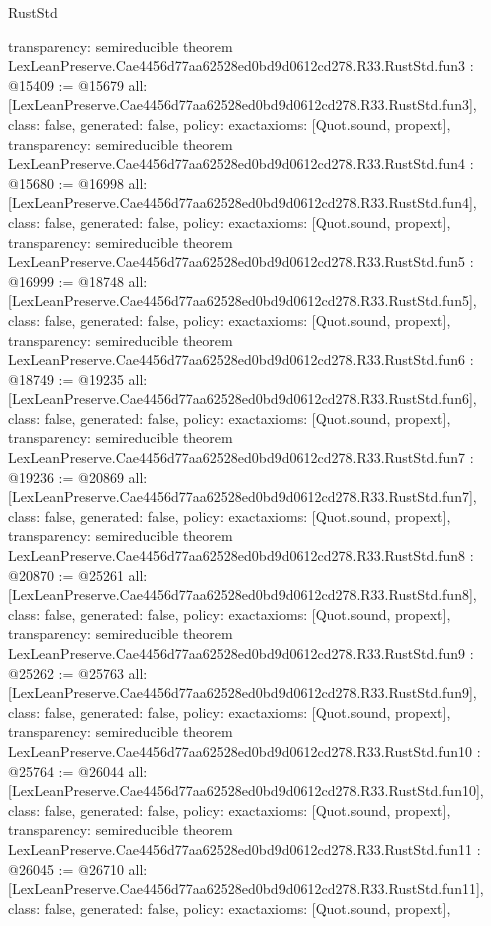 \begin{lexlean}{RustStd}
\begin{coremodule}
{  transparency: semireducible
}
theorem LexLeanPreserve.Cae4456d77aa62528ed0bd9d0612cd278.R33.RustStd.fun3 : @15409 := @15679 {
  all: [LexLeanPreserve.Cae4456d77aa62528ed0bd9d0612cd278.R33.RustStd.fun3],
  class: false,
  generated: false,
  policy: exact{axioms: [Quot.sound, propext]},
  transparency: semireducible
}
theorem LexLeanPreserve.Cae4456d77aa62528ed0bd9d0612cd278.R33.RustStd.fun4 : @15680 := @16998 {
  all: [LexLeanPreserve.Cae4456d77aa62528ed0bd9d0612cd278.R33.RustStd.fun4],
  class: false,
  generated: false,
  policy: exact{axioms: [Quot.sound, propext]},
  transparency: semireducible
}
theorem LexLeanPreserve.Cae4456d77aa62528ed0bd9d0612cd278.R33.RustStd.fun5 : @16999 := @18748 {
  all: [LexLeanPreserve.Cae4456d77aa62528ed0bd9d0612cd278.R33.RustStd.fun5],
  class: false,
  generated: false,
  policy: exact{axioms: [Quot.sound, propext]},
  transparency: semireducible
}
theorem LexLeanPreserve.Cae4456d77aa62528ed0bd9d0612cd278.R33.RustStd.fun6 : @18749 := @19235 {
  all: [LexLeanPreserve.Cae4456d77aa62528ed0bd9d0612cd278.R33.RustStd.fun6],
  class: false,
  generated: false,
  policy: exact{axioms: [Quot.sound, propext]},
  transparency: semireducible
}
theorem LexLeanPreserve.Cae4456d77aa62528ed0bd9d0612cd278.R33.RustStd.fun7 : @19236 := @20869 {
  all: [LexLeanPreserve.Cae4456d77aa62528ed0bd9d0612cd278.R33.RustStd.fun7],
  class: false,
  generated: false,
  policy: exact{axioms: [Quot.sound, propext]},
  transparency: semireducible
}
theorem LexLeanPreserve.Cae4456d77aa62528ed0bd9d0612cd278.R33.RustStd.fun8 : @20870 := @25261 {
  all: [LexLeanPreserve.Cae4456d77aa62528ed0bd9d0612cd278.R33.RustStd.fun8],
  class: false,
  generated: false,
  policy: exact{axioms: [Quot.sound, propext]},
  transparency: semireducible
}
theorem LexLeanPreserve.Cae4456d77aa62528ed0bd9d0612cd278.R33.RustStd.fun9 : @25262 := @25763 {
  all: [LexLeanPreserve.Cae4456d77aa62528ed0bd9d0612cd278.R33.RustStd.fun9],
  class: false,
  generated: false,
  policy: exact{axioms: [Quot.sound, propext]},
  transparency: semireducible
}
theorem LexLeanPreserve.Cae4456d77aa62528ed0bd9d0612cd278.R33.RustStd.fun10 : @25764 := @26044 {
  all: [LexLeanPreserve.Cae4456d77aa62528ed0bd9d0612cd278.R33.RustStd.fun10],
  class: false,
  generated: false,
  policy: exact{axioms: [Quot.sound, propext]},
  transparency: semireducible
}
theorem LexLeanPreserve.Cae4456d77aa62528ed0bd9d0612cd278.R33.RustStd.fun11 : @26045 := @26710 {
  all: [LexLeanPreserve.Cae4456d77aa62528ed0bd9d0612cd278.R33.RustStd.fun11],
  class: false,
  generated: false,
  policy: exact{axioms: [Quot.sound, propext]},
}
\end{coremodule}
\end{lexlean}
